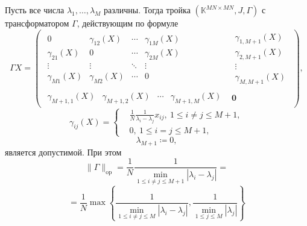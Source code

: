 \begin{ksvlem}
    Пусть все числа \( \lambda_1, \ldots, \lambda_M \) различны.
    Тогда тройка \( (\mathbb{K}^{{MN}{\times}{MN}}, J, \Gamma) \)
    с трансформатором \( \Gamma \), действующим по формуле
    \[
        \Gamma X =
        \left(\begin{array}{c|c}
            \begin{matrix}
                0               & \gamma_{12}(X) & \cdots & \gamma_{1M}(X) \\
                \gamma_{21}(X)  & 0              & \cdots & \gamma_{2M}(X) \\
                \vdots          & \vdots         & \ddots & \vdots & \ \\
                \gamma_{M1}(X)  & \gamma_{M2}(X) & \cdots & 0
            \end{matrix} &
            \begin{matrix}
                \gamma_{1,M+1}(X) \\
                \gamma_{2,M+1}(X) \\
                \vdots \\
                \gamma_{M,M+1}(X)
            \end{matrix} \\ \hline
            \begin{matrix}
                \gamma_{M{+}1,1}(X) &
                \gamma_{M{+}1,2}(X) &
                \cdots &
                \gamma_{M{+}1,M}(X)
            \end{matrix} &
            \mathbf{0}
        \end{array}\right),
        \]
    \[
        \gamma_{ij}(X) =
        \left\{\begin{aligned}
            & \frac1N \frac{1}{\lambda_i - \lambda_j} x_{ij},
              \ 1\leq i{\neq}j \leq M{+}1, \\
            & 0,
              \ 1\leq i{=}j \leq M{+}1,
        \end{aligned}\right.
        \]
    \[
        \lambda_{M+1} \coloneqq 0,
        \]
    является допустимой.
    При этом
    \[
        \|\Gamma\|_{\mathrm{op}} =
        \frac1N
        \frac{1}{\min_{1\leq i{\neq}j \leq M{+}1}|\lambda_i - \lambda_j|} =
        \]
    \[
        = \frac1N
         \max\left\{
         \frac{1}{
             \min\limits_{1\leq i{\neq}j \leq M }{|\lambda_i - \lambda_j|}},
         \frac{1}{
             \min\limits_{1\leq j \leq M}{|\lambda_j|}}
         \right\}
        \]
\end{ksvlem}

